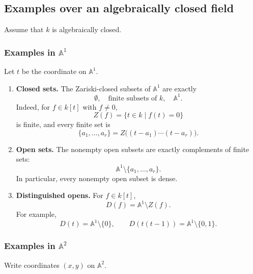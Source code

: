 \documentclass[12pt,a4paper]{article}
\theoremstyle{plain}
\theoremstyle{definition}      %
\begin{document}
\subsection*{Examples over an algebraically closed field}

Assume that $k$ is algebraically closed.

\subsubsection*{Examples in $\mathbb A^1$}

Let $t$ be the coordinate on $\mathbb A^1$.

\begin{enumerate}
	\item \textbf{Closed sets.}
	The Zariski-closed subsets of $\mathbb A^1$ are exactly
	\[
	\emptyset,
	\quad
	\text{finite subsets of }k,
	\quad
	\mathbb A^1.
	\]
	Indeed, for $f\in k[t]$ with $f\neq 0$,
	\[
	Z(f)
	=
	\{t\in k\mid f(t)=0\}
	\]
	is finite, and every finite set is
	\[
	\{a_1,\dots,a_r\}
	=
	Z\bigl((t-a_1)\cdots(t-a_r)\bigr).
	\]
	
	\item \textbf{Open sets.}
	The nonempty open subsets are exactly complements of finite sets:
	\[
	\mathbb A^1\setminus \{a_1,\dots,a_r\}.
	\]
	In particular, every nonempty open subset is dense.
	
	\item \textbf{Distinguished opens.}
	For $f\in k[t]$,
	\[
	D(f)=\mathbb A^1\setminus Z(f).
	\]
	For example,
	\[
	D(t)
	=
	\mathbb A^1\setminus\{0\},
	\qquad
	D(t(t-1))
	=
	\mathbb A^1\setminus\{0,1\}.
	\]
\end{enumerate}

\subsubsection*{Examples in $\mathbb A^2$}

Write coordinates $(x,y)$ on $\mathbb A^2$.
\end{document}
